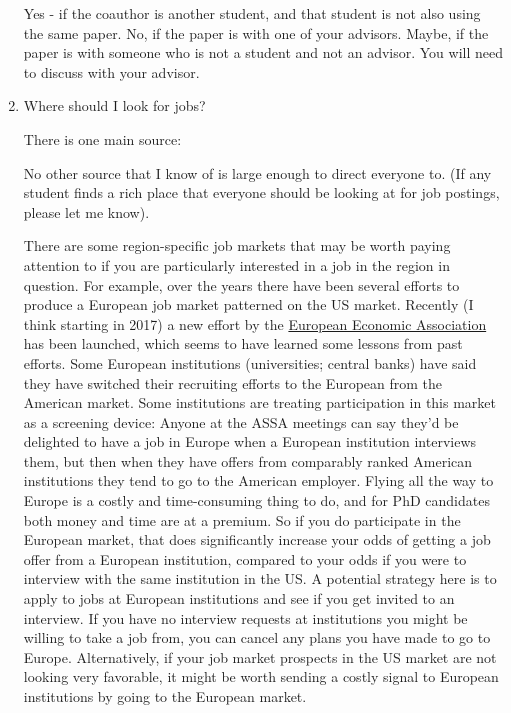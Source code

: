 \documentclass{econtex}
\begin{document}
\begin{enumerate}
  Yes - if the coauthor is another student, and that student is not
  also using the same paper.  No, if the paper is with one of your
  advisors.  Maybe, if the paper is with someone who is not a student
  and not an advisor.  You will need to discuss with your advisor.
  \hypertarget{Where-Should-I-Look-for-Jobs}{}

\item Where should I look for jobs? 

  There is one main source: \JOE

  No other source that I know of is large enough to direct everyone to. (If any student finds a rich place that everyone should be looking at for job postings, please let me know).

  \hypertarget{Region-Specific-Job-Markets}{}
  There are some region-specific job markets that may be worth paying attention to if you are particularly interested in a job in the region in question.  For example, over the years there have been several efforts to produce a European job market patterned on the US market.  Recently (I think starting in 2017) a new effort by the \href{https://www.eeassoc.org/}{European Economic Association} has been launched, which seems to have learned some lessons from past efforts. Some European institutions (universities; central banks) have said they have switched their recruiting efforts to the European from the American market.  Some institutions are treating participation in this market as a screening device: Anyone at the ASSA meetings can say they'd be delighted to have a job in Europe when a European institution interviews them, but then when they have offers from comparably ranked American institutions they tend to go to the American employer.  Flying all the way to Europe is a costly and time-consuming thing to do, and for PhD candidates both money and time are at a premium. So if you do participate in the European market, that does significantly increase your odds of getting a job offer from a European institution, compared to your odds if you were to interview with the same institution in the US. A potential strategy here is to apply to jobs at European institutions and see if you get invited to an interview.  If you have no interview requests at institutions you might be willing to take a job from, you can cancel any plans you have made to go to Europe.  Alternatively, if your job market prospects in the US market are not looking very favorable, it might be worth sending a costly signal to European institutions by going to the European market.


\end{enumerate}
\end{document}
